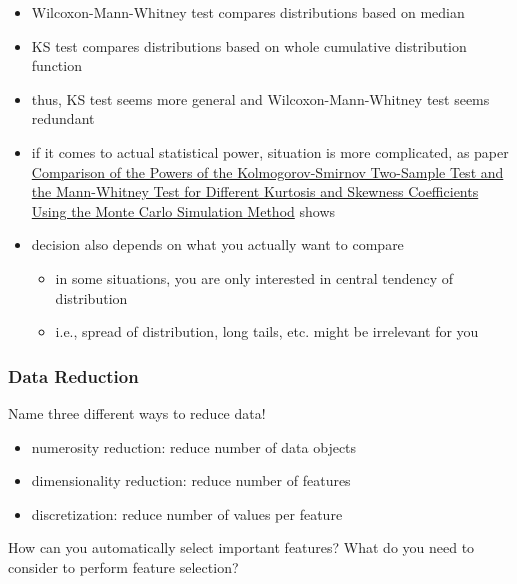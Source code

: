 \documentclass[12pt]{article}
\begin{document}
\begin{itemize}[left=0pt, nosep]
	\item Wilcoxon-Mann-Whitney test compares distributions based on median
	\item KS test compares distributions based on whole cumulative distribution function
	\item thus, KS test seems more general and Wilcoxon-Mann-Whitney test seems redundant
	\item if it comes to actual statistical power, situation is more complicated, as paper \href{https://www.scienpress.com/download.asp?ID=918}{Comparison of the Powers of the Kolmogorov-Smirnov Two-Sample Test and the Mann-Whitney Test for Different Kurtosis and Skewness Coefficients Using the Monte Carlo Simulation Method} shows
	\item decision also depends on what you actually want to compare
	\begin{itemize}[left=0pt, nosep]
		\item in some situations, you are only interested in central tendency of distribution
		\item i.e., spread of distribution, long tails, etc. might be irrelevant for you
	\end{itemize}
\end{itemize}

\pagebreak

\subsubsection*{Data Reduction}

\begin{question}
	Name three different ways to reduce data!
\end{question}

\begin{itemize}[left=0pt, nosep]
	\item numerosity reduction: reduce number of data objects
	\item dimensionality reduction: reduce number of features
	\item discretization: reduce number of values per feature
\end{itemize}

\begin{question}
	How can you automatically select important features?
	What do you need to consider to perform feature selection?
\end{question}
\end{document}
